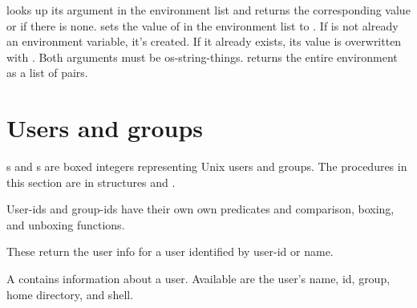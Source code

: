\begin{protos}
\end{protos}
\noindent
{} looks up its argument in the
 environment list and returns the corresponding value or 
 if there is none.
 sets the value of  in the
environment list to . If  is not already an environment
variable, it's created. If it already exists, its value is overwritten with
. Both arguments must be os-string-things.
 returns the entire environment as a list of
  pairs.

\section{Users and groups}

\/s and \/s are boxed integers representing
 Unix users and groups.
The procedures in this section are in structures  and
 .

\begin{protos}
\end{protos}

\begin{protos}
\end{protos}
\noindent
User-ids and group-ids have their own
 own predicates and comparison, boxing, and unboxing functions.

\begin{protos}
\end{protos}
\noindent
These return the user info for a user identified by user-id or name.

\begin{protos}
\end{protos}
\noindent
A  contains information about a user.
Available are the user's name, id, group, home directory, and shell.

